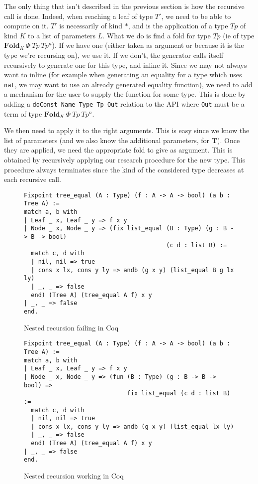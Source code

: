 \documentclass{article}
\newcommand{\fld}{\mathbf{Fold}}
\begin{document}
The only thing that isn't described in the previous section is how the recursive
call is done. Indeed, when reaching a leaf of type $T'$, we need to be able to
compute on it. $T'$ is necessarily of kind $*$, and is the application of a
type $Tp$ of kind $K$ to a list of parameters $L$. What we do is find a fold
for type $Tp$ (ie of type $\fld_K\ \Phi\ Tp\ Tp^n$). If we have one (either
taken as argument or because it is the type we're recursing on), we use it.
If we don't, the generator calls itself recursively to generate one for this
type, and inline it. Since we may not always want to inline (for example when
generating an equality for a type which uses \texttt{nat}, we may want to
use an already generated equality function), we need to add a mechanism for
the user to supply the function for some type. This is done by adding a
\texttt{doConst Name Type Tp Out} relation to the API where \texttt{Out} must
be a term of type $\fld_K\ \Phi\ Tp\ Tp^n$.

We then need to apply it to the right arguments. This is easy since we know the
list of parameters (and we also know the additional parameters, for $\mathbf{T}$).
Once they are applied, we need the appropriate fold to give as argument. This is
obtained by recursively applying our research procedure for the new type. This
procedure always terminates since the kind of the considered type decreases at
each recursive call.

\begin{figure}
    \begin{verbatim}
Fixpoint tree_equal (A : Type) (f : A -> A -> bool) (a b : Tree A) :=
match a, b with
| Leaf _ x, Leaf _ y => f x y
| Node _ x, Node _ y => (fix list_equal (B : Type) (g : B -> B -> bool)
                                        (c d : list B) :=
  match c, d with
  | nil, nil => true
  | cons x lx, cons y ly => andb (g x y) (list_equal B g lx ly)
  | _, _ => false
  end) (Tree A) (tree_equal A f) x y
| _, _ => false
end.
    \end{verbatim}
    \caption{Nested recursion failing in Coq}
    \label{coqindfail}
\end{figure}

\begin{figure}
    \begin{verbatim}
Fixpoint tree_equal (A : Type) (f : A -> A -> bool) (a b : Tree A) :=
match a, b with
| Leaf _ x, Leaf _ y => f x y
| Node _ x, Node _ y => (fun (B : Type) (g : B -> B -> bool) =>
                             fix list_equal (c d : list B) :=
  match c, d with
  | nil, nil => true
  | cons x lx, cons y ly => andb (g x y) (list_equal lx ly)
  | _, _ => false
  end) (Tree A) (tree_equal A f) x y
| _, _ => false
end.
    \end{verbatim}
    \caption{Nested recursion working in Coq}
    \label{coqind}
\end{figure}
\end{document}
